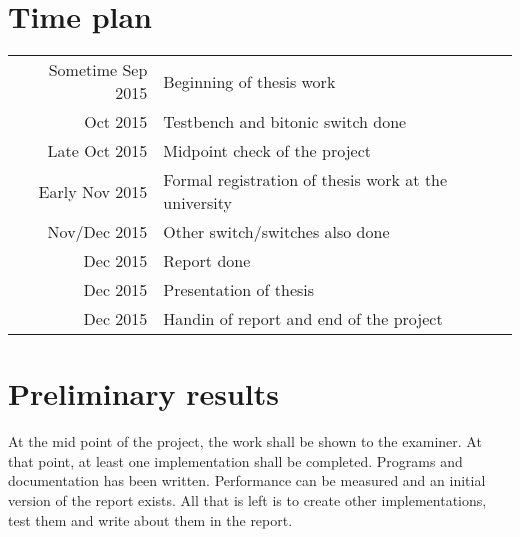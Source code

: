 \documentclass[12pt]{report}
\begin{document}
\section{Time plan}

\begin{tabular}{r l}
	Sometime Sep 2015 & Beginning of thesis work \\
	Oct 2015 & Testbench and bitonic switch done \\
	Late Oct 2015 & Midpoint check of the project \\
	Early Nov 2015 & Formal registration of thesis work at the university \\
	Nov/Dec 2015 & Other switch/switches also done \\
	Dec 2015 & Report done \\
	Dec 2015 & Presentation of thesis \\
	Dec 2015 & Handin of report and end of the project \\
\end{tabular}

\section{Preliminary results}

At the mid point of the project, the work shall be shown to the examiner. At
that point, at least one implementation shall be completed. Programs and
documentation has been written. Performance can be measured and an initial
version of the report exists. All that is left is to create other
implementations, test them and write about them in the report.
\end{document}
